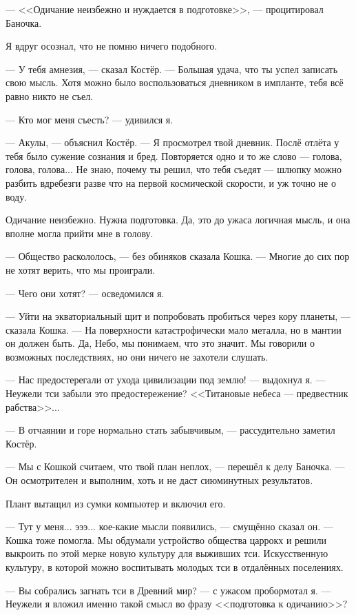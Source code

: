 --- <<Одичание неизбежно и нуждается в подготовке>>, --- процитировал Баночка.

Я вдруг осознал, что не помню ничего подобного.

--- У тебя амнезия, --- сказал Костёр.
--- Большая удача, что ты успел записать свою мысль.
Хотя можно было воспользоваться дневником в импланте, тебя всё равно никто не съел.

--- Кто мог меня съесть? --- удивился я.

--- Акулы, --- объяснил Костёр.
--- Я просмотрел твой дневник.
Послё отлёта у тебя было сужение сознания и бред.
Повторяется одно и то же слово --- голова, голова, голова...
Не знаю, почему ты решил, что тебя съедят --- шлюпку можно разбить вдребезги разве что на первой космической скорости, и уж точно не о воду.

Одичание неизбежно.
Нужна подготовка.
Да, это до ужаса логичная мысль, и она вполне могла прийти мне в голову.

--- Общество раскололось, --- без обиняков сказала Кошка.
--- Многие до сих пор не хотят верить, что мы проиграли.

--- Чего они хотят? --- осведомился я.

--- Уйти на экваториальный щит и попробовать пробиться через кору планеты, --- сказала Кошка.
--- На поверхности катастрофически мало металла, но в мантии он должен быть.
Да, Небо, мы понимаем, что это значит.
Мы говорили о возможных последствиях, но они ничего не захотели слушать.

--- Нас предостерегали от ухода цивилизации под землю! --- выдохнул я.
--- Неужели тси забыли это предостережение?
<<Титановые небеса --- предвестник рабства>>...

--- В отчаянии и горе нормально стать забывчивым, --- рассудительно заметил Костёр.

--- Мы с Кошкой считаем, что твой план неплох, --- перешёл к делу Баночка.
--- Он осмотрителен и выполним, хоть и не даст сиюминутных результатов.

Плант вытащил из сумки компьютер и включил его.

--- Тут у меня... эээ... кое-какие мысли появились, --- смущённо сказал он.
--- Кошка тоже помогла.
Мы обдумали устройство общества царрокх и решили выкроить по этой мерке новую культуру для выживших тси.
Искусственную культуру, в которой можно воспитывать молодых тси в отдалённых поселениях.

--- Вы собрались загнать тси в Древний мир? --- с ужасом пробормотал я.
--- Неужели я вложил именно такой смысл во фразу <<подготовка к одичанию>>?

